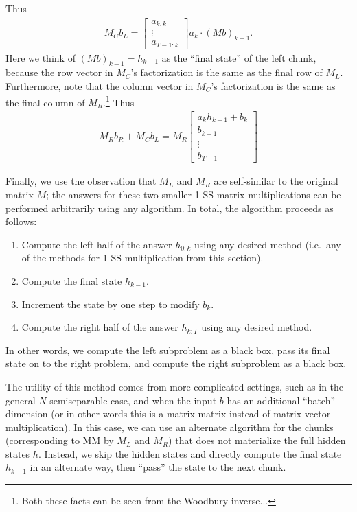 \documentclass{article}
\begin{document}
Thus
\begin{align*}
  M_C b_L =
  \begin{bmatrix} a_{k:k} \\ \vdots \\ a_{T-1:k} \end{bmatrix}
  a_k
  \cdot
  (Mb)_{k-1}
  .
\end{align*}
Here we think of $(Mb)_{k-1} = h_{k-1}$ as the ``final state'' of the left chunk,
because the row vector in $M_C$'s factorization is the same as the final row of $M_L$.
Furthermore, note that the column vector in $M_C$'s factorization is the same as the final column of $M_R$.\footnote{Both these facts can be seen from the Woodbury inverse...}
Thus
\begin{align*}
  M_R b_R + M_C b_L =
  M_R
  \begin{bmatrix} a_k h_{k-1} + b_k \\ b_{k+1} \\ \vdots \\ b_{T-1} \end{bmatrix}
\end{align*}

Finally, we use the observation that $M_L$ and $M_R$ are self-similar to the original matrix $M$; the answers for these two smaller 1-SS matrix multiplications can be performed arbitrarily using any algorithm.
In total, the algorithm proceeds as follows:
\begin{enumerate}
  \item Compute the left half of the answer $h_{0:k}$ using any desired method (i.e.\ any of the methods for 1-SS multiplication from this section).
  \item Compute the final state $h_{k-1}$. 
  \item Increment the state by one step to modify $b_{k}$.
  \item Compute the right half of the answer $h_{k:T}$ using any desired method.
\end{enumerate}

In other words, we compute the left subproblem as a black box, pass its final state on to the right problem, and compute the right subproblem as a black box.

The utility of this method comes from more complicated settings, such as in the general $N$-semiseparable case,
and when the input $b$ has an additional ``batch'' dimension (or in other words this is a matrix-matrix instead of matrix-vector multiplication).
In this case, we can use an alternate algorithm for the chunks (corresponding to MM by $M_L$ and $M_R$) that does not materialize the full hidden states $h$.
Instead, we skip the hidden states and directly compute the final state $h_{k-1}$ in an alternate way, then ``pass'' the state to the next chunk.
\end{document}
